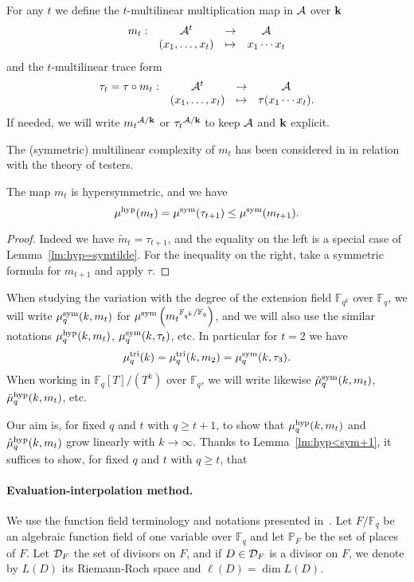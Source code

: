 \documentclass[11pt]{article}
\begin{document}
For any $t$ we define the $t$-multilinear multiplication map in $\mathcal{A}$ over $\mathbf{k}$
\[
\begin{array}{cccc}
m_t:&\mathcal{A}^t&\to&\mathcal{A}\\
&(x_1,\dots,x_t)&\mapsto&x_1\cdots x_t
\end{array}
\]
and the $t$-multilinear trace form
\[
\begin{array}{cccc}
\tau_t=\tau\circ m_t:&\mathcal{A}^t&\to&\mathcal{A}\\
&(x_1,\dots,x_t)&\mapsto&\tau(x_1\cdots x_t).
\end{array}
\]
If needed, we will write ${m_t}^{\mathcal{A}/\mathbf{k}}$ or ${\tau_t}^{\mathcal{A}/\mathbf{k}}$ to keep $\mathcal{A}$ and $\mathbf{k}$ explicit. 

The (symmetric) multilinear complexity of $m_t$ has been considered in \cite{Bshouty13} in relation with the theory of testers.

\begin{lm}
\label{lm:hyp<sym+1}
The map $m_t$ is hypersymmetric, and we have
\[
\mu^{\textrm{hyp}}(m_t)=\mu^{\textrm{sym}}(\tau_{t+1})\leq\mu^{\textrm{sym}}(m_{t+1}).
\] 
\end{lm}
\begin{proof}
Indeed we have $\widetilde{m}_t=\tau_{t+1}$, and the equality on the left is a special case of Lemma~\ref{lm:hyp=symtilde}.
For the inequality on the right, take a symmetric formula for $m_{t+1}$ and apply $\tau$.
\end{proof}

When studying the variation with the degree of the extension field $\mathbb{F}_{q^k}$ over $\mathbb{F}_q$,
we will write $\mu^{\textrm{sym}}_q(k,m_t)$ for $\mu^{\textrm{sym}}\left({m_t}^{\mathbb{F}_{q^k}/\mathbb{F}_q}\right)$,
and we will also use the similar notations $\mu^{\textrm{hyp}}_q(k,m_t)$, $\mu^{\textrm{sym}}_q(k,\tau_t)$, etc.
In particular for $t=2$ we have
\[
\mutri_q(k)=\mutri_q(k,m_2)=\musym_q(k,\tau_3). %
\]
When working in $\mathbb{F}_q[T]/(T^k)$ over $\mathbb{F}_q$,
we will write likewise $\hat\mu^{\textrm{sym}}_q(k,m_t)$, $\hat\mu^{\textrm{hyp}}_q(k,m_t)$, etc.

Our aim is, for fixed $q$ and $t$ with $q\geq t+1$, to show that $\mu^{\textrm{hyp}}_q(k,m_t)$ and $\hat\mu^{\textrm{hyp}}_q(k,m_t)$ grow linearly with $k\to\infty$.
Thanks to Lemma~\ref{lm:hyp<sym+1}, it suffices to show, for fixed $q$ and $t$ with $q\geq t$, that



\paragraph{Evaluation-interpolation method.}
We use the function field terminology and notations
presented in~\cite{Stichtenoth09}. Let $F/\mathbb{F}_q$ be an algebraic
function field of one variable over $\mathbb{F}_{q}$ and let $\mathbb{P}_F$ be the
set of places of $F$. Let $\mathcal{D}_F$ the set of
divisors on $F$, and if $D\in\mathcal{D}_F$ is a divisor on
$F$, we denote by $L(D)$ its Riemann-Roch space and $\ell(D)=\dim L(D)$.
\end{document}

